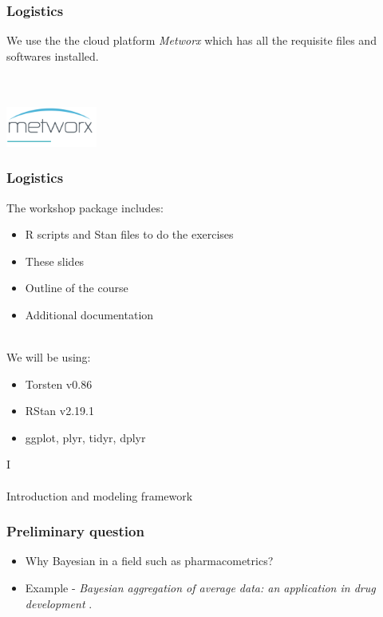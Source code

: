 \documentclass[xcolor=table]{beamer}
\begin{document}
\begin{frame}
  \frametitle{Logistics}
  
  We use the the cloud platform \textit{Metworx}
  which has all the requisite files and softwares installed. \\ \ \\ \ \\
  
  \begin{center}
    \includegraphics[width=3cm]{../metworx}
  \end{center}
  
\end{frame}

\begin{frame}
  \frametitle{Logistics}

  The workshop package includes:
  \begin{itemize}
    \item R scripts and Stan files to do the exercises
    \item These slides
    \item Outline of the course
    \item Additional documentation
  \end{itemize}
  
  \ \\
  We will be using:
  \begin{itemize}
    \item Torsten v0.86
    \item RStan v2.19.1
    \item ggplot, plyr, tidyr, dplyr
  \end{itemize}

\end{frame}

\begin{frame}
  \begin{center}
    {\Large I} \\ \ \\ Introduction and modeling framework
  \end{center}
\end{frame}

\begin{frame}
  \frametitle{Preliminary question}
  \begin{itemize}
    \item Why Bayesian in a field such as pharmacometrics?
    \item Example - \textit{Bayesian aggregation of average data: an application
      in drug development} \cite{Weber:2018}.
  \end{itemize}
\end{frame}
\end{document}
